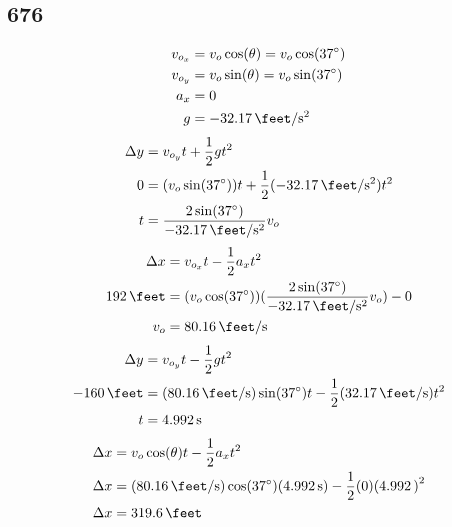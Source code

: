 \documentclass{article}
\begin{document}
\subsection{676}
\begin{align*}
	v_{o_x} & = v_o\cos(\theta) = v_o\cos(\SI{37}{\degree}) \\
	v_{o_y} & = v_o\sin(\theta) = v_o\sin(\SI{37}{\degree}) \\
	a_x & = 0 \\
	g & = -\SI{32.17}{\feet \per \second \squared}
\end{align*}
\begin{align*}
	\Delta y & = v_{o_y}t + \frac{1}{2}gt^2 \\
	0 & = (v_o\sin(\SI{37}{\degree}))t + \frac{1}{2}(-\SI{32.17}{\feet \per \second \squared})t^2 \\
	t & = \frac{2\sin(\SI{37}{\degree})}{-\SI{32.17}{\feet \per \second \squared}}v_o
\end{align*}
\begin{align*}
	\Delta x & = v_{o_x}t - \frac{1}{2}a_xt^2 \\
	\SI{192}{\feet} & = (v_o\cos(\SI{37}{\degree}))(\frac{2\sin(\SI{37}{\degree})}{-\SI{32.17}{\feet \per \second \squared}}v_o) - 0 \\
	v_o & = \SI{80.16}{\feet \per \second}
\end{align*}
\begin{align*}
	\Delta y & = v_{o_y}t - \frac{1}{2}gt^2 \\
	-\SI{160}{\feet} & = (\SI{80.16}{\feet \per \second})\sin(\SI{37}{\degree})t - \frac{1}{2}(\SI{32.17}{\feet \per \second})t^2 \\
	t & = \SI{4.992}{\second}
\end{align*}
\begin{align*}
	\Delta x & = v_o\cos(\theta)t - \frac{1}{2}a_xt^2 \\
	\Delta x & = (\SI{80.16}{\feet \per \second})\cos(\SI{37}{\degree})(\SI{4.992}{\second}) - \frac{1}{2}(0)(\SI{4.992})^2 \\
	\Delta x & = \SI{319.6}{\feet}
\end{align*}
\end{document}
